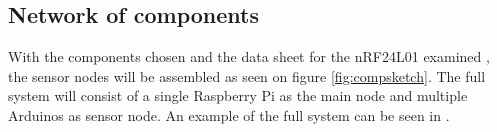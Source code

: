 \subsection*{Network of components}
With the components chosen and the data sheet for the nRF24L01 examined \cite{nf24datasheet}, the sensor nodes will be assembled as seen on figure \ref{fig:compsketch}. The full system will consist of a single Raspberry Pi as the main node and multiple Arduinos as sensor node. An example of the full system can be seen in .



